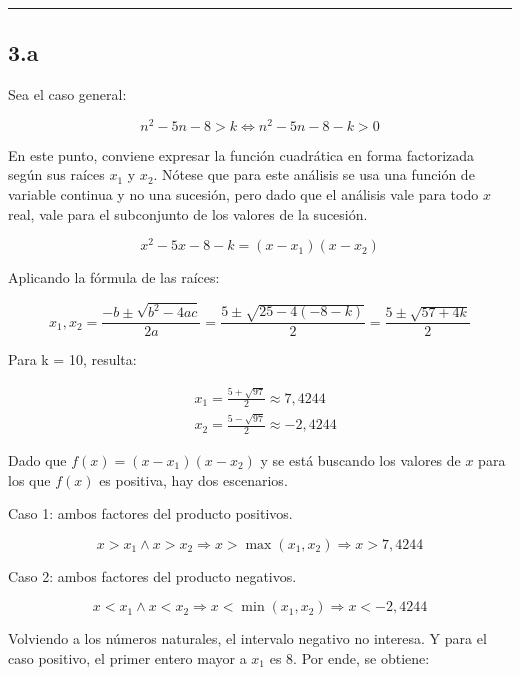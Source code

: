 \documentclass{article}
\newcommand{\subsectionx}[1]{\subsection*{#1}\label{subsec:#1}\addcontentsline{toc}{subsection}{\nameref{subsec:#1}}}
\begin{document}
\hrule

\subsectionx{3.a}

Sea el caso general:

\begin{equation}
n^2 - 5n -8 > k \Leftrightarrow n^2 - 5n -8 - k > 0
\end{equation}

En este punto, conviene expresar la función cuadrática en forma factorizada según sus raíces $ x_1 $ y $ x_2 $. Nótese que para este análisis se usa una función de variable continua y no una sucesión, pero dado que el análisis vale para todo $ x $ real, vale para el subconjunto de los valores de la sucesión.

\begin{equation}
x^2 - 5x -8 - k = (x-x_1) (x-x_2)
\end{equation}

Aplicando la fórmula de las raíces:

\begin{equation}
x_1, x_2 = \frac{-b \pm \sqrt{b^2 - 4 a c}}{2a} = \frac{5 \pm \sqrt{25 - 4 (-8-k)}}{2} = \frac{5 \pm \sqrt{57 + 4k}}{2}
\end{equation}

Para k = 10, resulta:

\begin{subequations}
\begin{align}
& x_1 = \frac{5+\sqrt{97}}{2} \approx 7,4244 \\
& x_2 = \frac{5-\sqrt{97}}{2} \approx -2,4244
\end{align}
\end{subequations}

Dado que $ f(x) = (x-x_1) (x-x_2) $ y se está buscando los valores de $ x $ para los que $ f(x) $ es positiva, hay dos escenarios.

Caso 1: ambos factores del producto positivos.

\begin{equation}
x > x_1 \wedge x > x_2 \Rightarrow x > \mathop{\text{max}}(x_1, x_2) \Rightarrow x > 7,4244
\end{equation}

Caso 2: ambos factores del producto negativos.

\begin{equation}
x < x_1 \wedge x < x_2 \Rightarrow x < \mathop{\text{min}}(x_1, x_2) \Rightarrow x < -2,4244
\end{equation}

Volviendo a los números naturales, el intervalo negativo no interesa. Y para el caso positivo, el primer entero mayor a $ x_1 $ es 8. Por ende, se obtiene:
\end{document}
